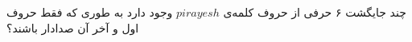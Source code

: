 \p
چند جایگشت ۶ حرفی از حروف کلمه‌ی $pirayesh$
وجود دارد به طوری که فقط حروف اول و آخر آن صدادار باشند؟ 
